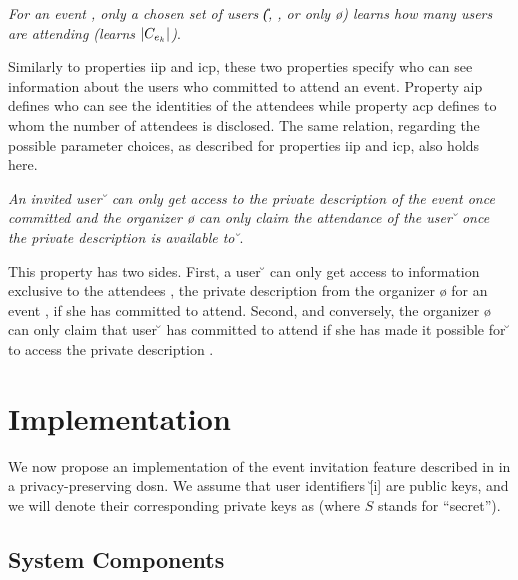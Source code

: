 {	%
	\begin{propertydef}[\Ac{acp}]
		\textit{For an event \e{}, only a chosen 
		set of users (\eg \U{}, \I{}, \C{} or only \o{}) learns
		how many users are attending (\ie learns $| \C{} |$)}.
	\end{propertydef}
	Similarly to properties \Ac{iip} and \Ac{icp}, these two properties specify who 
	can see information about the users who committed to attend an event.  
	Property \Ac{aip} defines who can see the identities of the attendees while 
	property \Ac{acp} defines to whom the number of attendees is disclosed. The 
	same relation, regarding the possible parameter choices, as
	described for properties \Ac{iip} and \Ac{icp}, also holds here.

	\begin{propertydef}[\Ac{air}]
		\textit{An invited user \u{} can only get access to the private description 
		\dS{} of the event \e{} once committed and the organizer \o{} 
		can only claim the attendance of the user \u{} once the private description 
		\dS{} is available to \u{}}.
		\par \noindent
		This property has two sides. First, a user \u{} can only get access
		to information exclusive to the attendees \C{}, \ie the private description
		\dS{} from the organizer \o{} for an event \e{},
		if she has committed to attend. Second, and conversely, the
		organizer \o{} can only claim that user \u{} has
		committed to attend if she has made it possible for \u{} to access
		the private description \dS{}.
	\end{propertydef}
}

\section{Implementation}
	\label{section:event-invitations-dosns:implementation}
We now propose an implementation of the event invitation feature described in  in 
a privacy-preserving \Ac{dosn}. We assume that user identifiers \u[i] are 
public keys, and we will denote their corresponding private keys as \uS[i] (where 
$S$ stands for ``secret'').

\subsection{System Components}
	\label{subsection:event-invitations-dosns:system-components}

